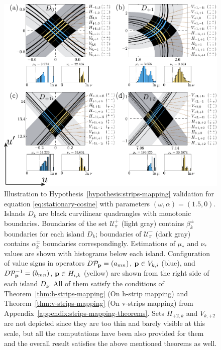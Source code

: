 \begin{figure}[h!]
\centering
	\includegraphics[scale = 1]{pic/hypotheses for cosine equation}
	\caption{
		Illustration to Hypothesis~\ref{hypothesis:strips-mapping} validation for equation \eqref{eq:stationary-cosine} with parameters $(\omega, \alpha) = (1.5, 0)$.
		Islands $D_k$ are black curvilinear quadrangles with monotonic boundaries.
		Boundaries of the set $\mathscr{U}_{\pi}^+$ (light gray) contains $\beta_k^{\pm}$ boundaries for each island $D_k$; boundaries of $\mathscr{U}_{\pi}^-$ (dark gray) contains $\alpha_k^{\pm}$ boundaries correspondingly.
		Estimations of $\mu_*$ and $\nu_*$ values are shown with histograms below each island.
		Configuration of value signs in operators $D \mathcal{P}_{\vb{p}} = (a_{mn})$, $\vb{p} \in V_{k, i}$ (blue), and $D \mathcal{P}^{-1}_{\vb{p}} = (b_{mn})$, $\vb{p} \in H_{i, k} $ (yellow) are shown from the right side of each island $D_k$.
		All of them satisfy the conditions of Theorem~\ref{thm:h-strips-mapping} (On h-strip mapping) and Theorem~\ref{thm:v-strips-mapping} (On v-strips mapping) from Appendix~\ref{appendix:strips-mapping-theorems}.
		Sets $H_{+2, k}$ and $V_{k, +2}$ are not depicted since they are too thin and barely visible at this scale, but all the computations have been also provided for them and the overall result satisfies the above mentioned theorems as well.
	}
\label{fig:hypotheses-validation-cosine}
\end{figure}

